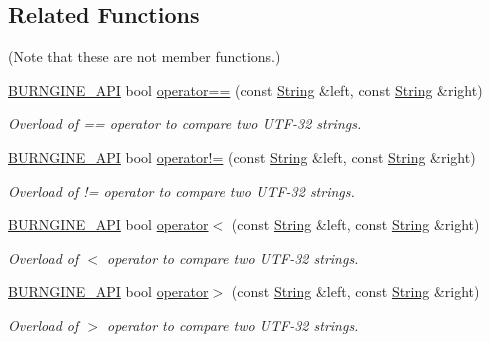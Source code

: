 \subsection*{Related Functions}
(Note that these are not member functions.) \begin{DoxyCompactItemize}
\item 
\hyperlink{_export_8h_a5040e4252a67428f940a23fa9dbfec7b}{B\-U\-R\-N\-G\-I\-N\-E\-\_\-\-A\-P\-I} bool \hyperlink{classburn_1_1_string_acd3ff7c79fe5f694755cde868e0b953a}{operator==} (const \hyperlink{classburn_1_1_string}{String} \&left, const \hyperlink{classburn_1_1_string}{String} \&right)
\begin{DoxyCompactList}\small\item\em Overload of == operator to compare two U\-T\-F-\/32 strings. \end{DoxyCompactList}\item 
\hyperlink{_export_8h_a5040e4252a67428f940a23fa9dbfec7b}{B\-U\-R\-N\-G\-I\-N\-E\-\_\-\-A\-P\-I} bool \hyperlink{classburn_1_1_string_aa699fb80a7e683001cc381a904adf7c7}{operator!=} (const \hyperlink{classburn_1_1_string}{String} \&left, const \hyperlink{classburn_1_1_string}{String} \&right)
\begin{DoxyCompactList}\small\item\em Overload of != operator to compare two U\-T\-F-\/32 strings. \end{DoxyCompactList}\item 
\hyperlink{_export_8h_a5040e4252a67428f940a23fa9dbfec7b}{B\-U\-R\-N\-G\-I\-N\-E\-\_\-\-A\-P\-I} bool \hyperlink{classburn_1_1_string_a4a8fbb4493570c7025b3ddf4d6577295}{operator$<$} (const \hyperlink{classburn_1_1_string}{String} \&left, const \hyperlink{classburn_1_1_string}{String} \&right)
\begin{DoxyCompactList}\small\item\em Overload of $<$ operator to compare two U\-T\-F-\/32 strings. \end{DoxyCompactList}\item 
\hyperlink{_export_8h_a5040e4252a67428f940a23fa9dbfec7b}{B\-U\-R\-N\-G\-I\-N\-E\-\_\-\-A\-P\-I} bool \hyperlink{classburn_1_1_string_a11d2287c52543833b39574735b4a0a52}{operator$>$} (const \hyperlink{classburn_1_1_string}{String} \&left, const \hyperlink{classburn_1_1_string}{String} \&right)
\begin{DoxyCompactList}\small\item\em Overload of $>$ operator to compare two U\-T\-F-\/32 strings. \end{DoxyCompactList}\item 

\end{DoxyCompactItemize}
